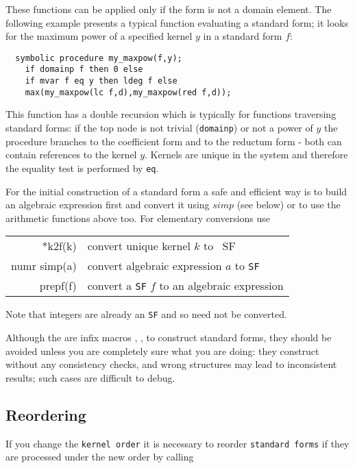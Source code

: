 \documentclass[11pt]{article}
\makeatletter
\newcommand{\ttindex}[1]{\index{#1@{\texttt{#1}}}}
\makeatother
\begin{document}
These functions can be applied only if the form
is not a domain element. The following example presents
a typical function evaluating a standard form; it looks for the
maximum power of a specified kernel $y$ in a standard form $f$:

\begin{verbatim}
  symbolic procedure my_maxpow(f,y);
    if domainp f then 0 else
    if mvar f eq y then ldeg f else
    max(my_maxpow(lc f,d),my_maxpow(red f,d));
\end{verbatim}

This function has a double recursion which is typically
for functions traversing standard forms: if the top node is
not trivial ({\tt domainp}) or not a power of $y$ 
the procedure branches to the
coefficient form and to the reductum form - both
can contain references to the kernel $y$. Kernels are
unique in the system and therefore the equality test is
performed by {\tt eq}.

For the initial construction of a standard form a safe and efficient
way is to build an algebraic expression first and convert
it using $simp$ (see below) or to use the arithmetic functions 
above too. For elementary conversions use

\begin{center}
\begin{tabular}{|r|l|} \hline
    *k2f(k) &  convert unique kernel $k$ to {\ SF} \\ 
    numr simp(a)& convert algebraic expression $a$ to {\tt SF}\\
    prepf(f)& convert a {\tt SF} $f$ to an algebraic expression\\ 
\hline
\end{tabular}
\end{center}
Note that integers are already an {\tt SF} and so need not be converted.
    
Although the are infix macros  ,  ,  to
construct standard forms, they should be avoided unless
you are completely sure what you are doing: they construct
without any consistency checks, and wrong structures may lead
to inconsistent results; such cases are difficult to debug.

\subsection{Reordering}

If you change the {\tt kernel order}\ttindex{kernel order} it is 
necessary to reorder {\tt standard forms} if they
are processed under the new order by calling
\end{document}
